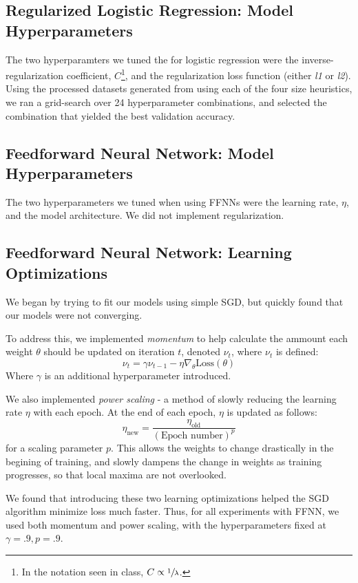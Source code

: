 \documentclass[letterpaper, 10 pt, conference]{ieeeconf}
\begin{document}
\subsection{Regularized Logistic Regression: Model Hyperparameters} 

The two hyperparamters we tuned the for logistic regression were the inverse-regularization coefficient, $C$\footnote{In the notation seen in class, $C \propto \sfrac{1}{\lambda}$.}, and the regularization loss function (either \emph{l1} or \emph{l2}). Using the processed datasets generated from using each of the four size heuristics, we ran a grid-search over 24 hyperparameter combinations, and selected the combination that yielded the best validation accuracy.   

\subsection{Feedforward Neural Network: Model Hyperparameters} 

The two hyperparameters we tuned when using FFNNs were the learning rate, $\eta$, and the model architecture. We did not implement regularization.

\subsection{Feedforward Neural Network: Learning Optimizations} 

We began by trying to fit our models using simple SGD, but quickly found that our models were not converging. 

To address this, we implemented \emph{momentum} to help calculate the ammount each weight $\theta$ should be updated on iteration $t$, denoted $\nu_t$, where $\nu_t$ is defined:
$$
\nu_t = \gamma\nu_{t-1} - \eta\nabla_{\theta}\text{Loss}(\theta)
$$
Where $\gamma$ is an additional hyperparameter introduced. 

We also implemented \emph{power scaling} - a method of slowly reducing the learning rate $\eta$ with each epoch. At the end of each epoch, $\eta$ is updated as follows:
$$
\eta_{\text{new}} = \frac{\eta_{\text{old}}}{(\text{Epoch number})^{p}}
$$
for a scaling parameter $p$. This allows the weights to change drastically in the begining of training, and slowly dampens the change in weights as training progresses, so that local maxima are not overlooked. 

We found that introducing these two learning optimizations helped the SGD algorithm minimize loss much faster. Thus, for all experiments with FFNN, we used both momentum and power scaling, with the hyperparameters fixed at $\gamma = .9, p = .9$. 
\end{document}
